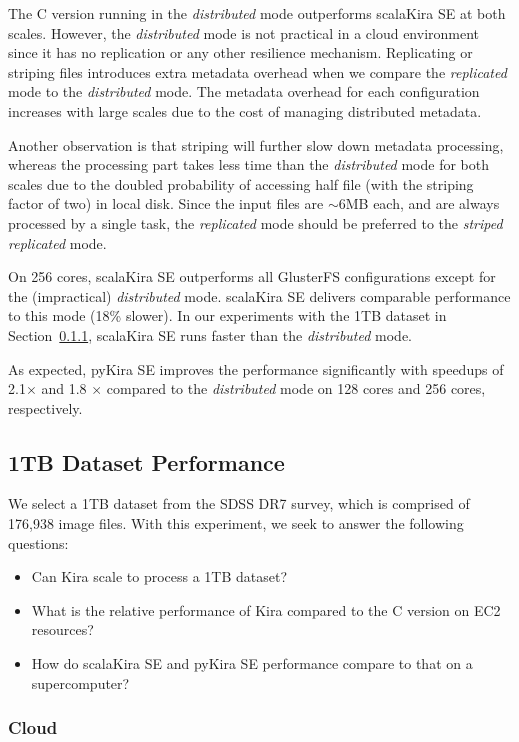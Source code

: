 \documentclass[10pt,journal,compsoc]{IEEEtran}
\begin{document}
The C version running in the \emph{distributed} mode outperforms scalaKira SE at both scales. 
However, the \emph{distributed} mode is not practical in a cloud environment since
it has no replication or any other resilience mechanism. Replicating or striping
files introduces extra metadata overhead when we compare the \emph{replicated} mode
to the \emph{distributed} mode. The metadata overhead for each configuration increases
with large scales due to the cost of managing distributed metadata.

Another observation is that striping will further slow down metadata processing, whereas the
processing part takes less time than the \emph{distributed} mode for both scales due
to the doubled probability of accessing half file (with the striping factor of two) in local disk.
Since the input files are $\sim$6MB each, and are always processed by a single task, the
\emph{replicated} mode should be preferred to the \emph{striped replicated} mode.

On 256 cores, scalaKira SE outperforms all GlusterFS configurations except for the (impractical) \emph{distributed}
mode. scalaKira SE delivers comparable performance to this mode (18\% slower). 
In our experiments with the 1TB dataset in Section~\ref{sec:1TB-EC2}, 
scalaKira SE runs faster than the \emph{distributed} mode.

As expected, pyKira SE improves the performance significantly with speedups of 2.1$\times$ and 1.8 $\times$
compared to the \emph{distributed} mode on 128 cores and 256 cores, respectively.

\subsection{1TB Dataset Performance}
\label{sec:Performance-1TB}

We select a 1TB dataset from the SDSS DR7 survey, which is comprised of 176,938 image files. 
With this experiment, we seek to answer the following questions: 

\begin{itemize}
\item Can Kira scale to process a 1TB dataset?
\item What is the relative performance of Kira compared to the C version on EC2 resources?
\item How do scalaKira SE and pyKira SE performance compare to that on a supercomputer?
\end{itemize}

\subsubsection{Cloud}
\label{sec:1TB-EC2}
\end{document}
